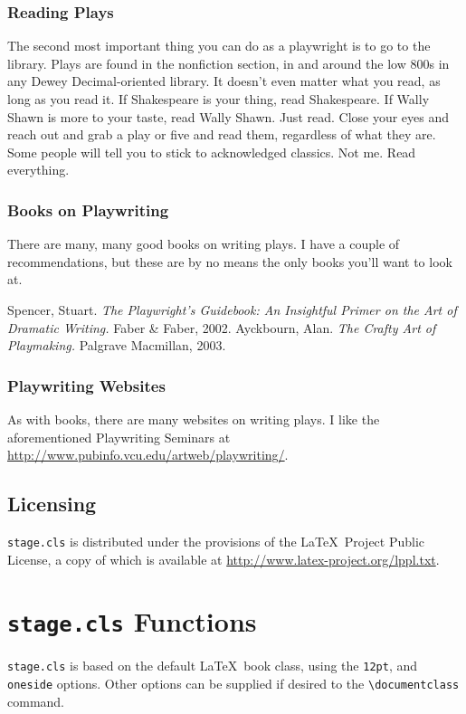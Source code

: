 \documentclass{report}
\begin{document}
\subsection{Reading Plays}
The second most important thing you can do as a playwright is to go to the library. Plays are found in the nonfiction section, in and around the low 800s in any Dewey Decimal-oriented library. It doesn’t even matter what you read, as long as you read it. If Shakespeare is your thing, read Shakespeare. If Wally Shawn is more to your taste, read Wally Shawn. Just read. Close your eyes and reach out and grab a play or five and read them, regardless of what they are. Some people will tell you to stick to acknowledged classics. Not me. Read everything.

\subsection{Books on Playwriting}

There are many, many good books on writing plays. I have a couple of recommendations, but these are by no means the only books you’ll want to look at.

Spencer, Stuart. \emph{The Playwright’s Guidebook: An Insightful Primer on the Art of Dramatic Writing.} Faber \& Faber, 2002. Ayckbourn, Alan. \emph{The Crafty Art of Playmaking.} Palgrave Macmillan, 2003.

\subsection{Playwriting Websites}
As with books, there are many websites on writing plays. I like the aforementioned Playwriting Seminars at \url{http://www.pubinfo.vcu.edu/artweb/playwriting/}.

\section{Licensing}

\texttt{stage.cls} is distributed under the provisions of the \LaTeX\ Project Public License, a copy of which is available at \url{http://www.latex-project.org/lppl.txt}.

\chapter{\texttt{stage.cls} Functions}

\texttt{stage.cls} is based on the default \LaTeX\ book class, using the \texttt{12pt}, and \texttt{oneside} options. Other options can be supplied if desired to the \verb|\documentclass| command.
\end{document}

